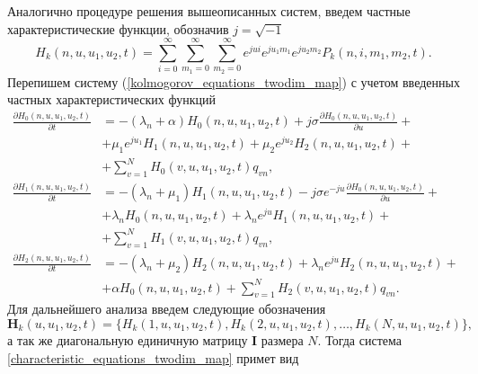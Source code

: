 Аналогично процедуре решения вышеописанных систем, введем частные характеристические функции, обозначив $j=\sqrt{-1}$
\begin{equation*}
	H_{k}(n,u,u_{1},u_{2},t) = \sum_{i=0}^{\infty}
	\sum_{m_{1}=0}^{\infty}
	\sum_{m_{2}=0}^{\infty}  
	e^{jui}e^{ju_{1}m_{1}}e^{ju_{2}m_{2}} P_{k}(n,i,m_{1},m_{2},t).
\end{equation*}
Перепишем систему (\ref{kolmogorov_equations_twodim_map}) с учетом введенных частных характеристических функций
\begin{equation} \label{characteristic_equations_twodim_map}
	\begin{split}
		\frac{{\partial H_{0}(n,u,u_{1},u_{2},t)}}{{\partial t}} &= -(\lambda_{n} + \alpha)H_{0}(n,u,u_{1},u_{2},t) + j\sigma
		\frac{{\partial H_{0}(n,u,u_{1},u_{2},t)}}{{\partial u}} +\\  &+ \mu_{1} e^{ju_{1}}H_{1}(n,u,u_{1},u_{2},t) + \mu_{2}e^{ju_{2}}H_{2}(n,u,u_{1},u_{2},t) +\\  &+ \sum_{v=1}^{N}H_{0}(v,u,u_{1},u_{2},t)q_{vn} ,
		\\
		\frac{{\partial H_{1}(n,u,u_{1},u_{2},t)}}{{\partial t}} &= -(\lambda_{n} + \mu_{1})H_{1}(n,u,u_{1},u_{2},t) - j\sigma e^{-ju}
		\frac{{\partial H_{0}(n,u,u_{1},u_{2},t)}}{{\partial u}} +\\  &+ \lambda_{n} H_{0}(n,u,u_{1},u_{2},t) + \lambda_{n} e^{ju}H_{1}(n,u,u_{1},u_{2},t) +\\  &+ \sum_{v=1}^{N}H_{1}(v,u,u_{1},u_{2},t)q_{vn} ,
		\\
		\frac{{\partial H_{2}(n,u,u_{1},u_{2},t)}}{{\partial t}} &= -(\lambda_{n} + \mu_{2})H_{2}(n,u,u_{1},u_{2},t)  + \lambda_{n} e^{ju}H_{2}(n,u,u_{1},u_{2},t) +\\  &+ \alpha H_{0}(n,u,u_{1},u_{2},t) + \sum_{v=1}^{N}H_{2}(v,u,u_{1},u_{2},t)q_{vn}.
	\end{split}
\end{equation}  
Для дальнейшего анализа введем следующие обозначения
\begin{equation*}	
\boldsymbol{H}_{k}(u,u_{1},u_{2},t) = \{H_{k}(1,u,u_{1},u_{2},t),H_{k}(2,u,u_{1},u_{2},t),\dots,H_{k}(N,u,u_{1},u_{2},t)\},
\end{equation*}
а так же диагональную единичную матрицу $\boldsymbol{I}$ размера $N$.
Тогда система \ref{characteristic_equations_twodim_map} примет вид
